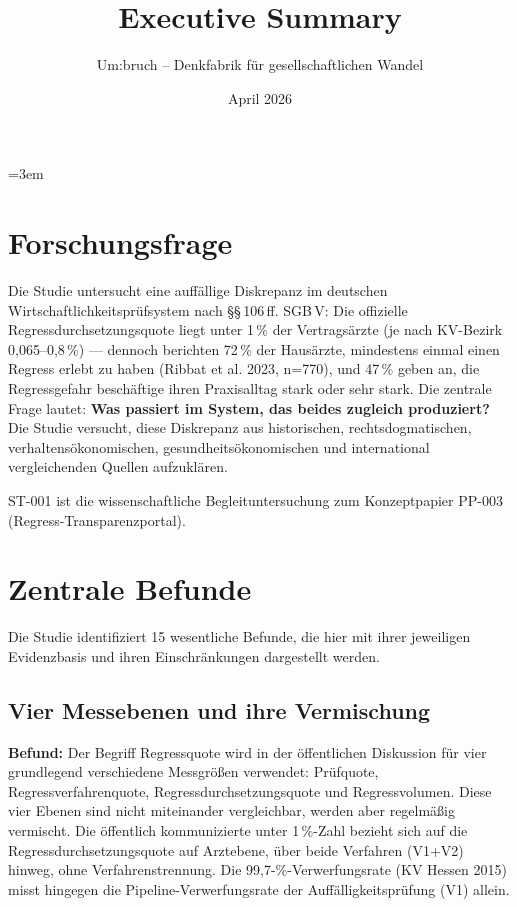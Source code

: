 \documentclass{umbruch-position}
\title{Executive Summary}
\author{Um:bruch -- Denkfabrik f\"ur gesellschaftlichen Wandel}
\date{April 2026}
\begin{document}
\emergencystretch=3em
\maketitle

\section{Forschungsfrage}

Die Studie untersucht eine auff\"allige Diskrepanz im deutschen Wirtschaftlichkeitspr\"ufsystem nach \S\S\,106\,ff. SGB\,V: Die offizielle Regressdurchsetzungsquote liegt unter 1\,\% der Vertrags\"arzte (je nach KV-Bezirk 0,065--0,8\,\%) --- dennoch berichten 72\,\% der Haus\"arzte, mindestens einmal einen Regress erlebt zu haben (Ribbat et al. 2023, n=770), und 47\,\% geben an, die Regressgefahr besch\"aftige ihren Praxisalltag \glqq{}stark oder sehr stark\grqq{}. Die zentrale Frage lautet: \textbf{Was passiert im System, das beides zugleich produziert?} Die Studie versucht, diese Diskrepanz aus historischen, rechtsdogmatischen, verhaltens\"okonomischen, gesundheits\"okonomischen und international vergleichenden Quellen aufzukl\"aren.

ST-001 ist die wissenschaftliche Begleituntersuchung zum Konzeptpapier PP-003 (Regress-Transparenzportal).

\section{Zentrale Befunde}

Die Studie identifiziert 15 wesentliche Befunde, die hier mit ihrer jeweiligen Evidenzbasis und ihren Einschr\"ankungen dargestellt werden.

\subsection{Vier Messebenen und ihre Vermischung}

\textbf{Befund:} Der Begriff \glqq{}Regressquote\grqq{} wird in der \"offentlichen Diskussion f\"ur vier grundlegend verschiedene Messgr\"o\ss{}en verwendet: Pr\"ufquote, Regressverfahrenquote, Regressdurchsetzungsquote und Regressvolumen. Diese vier Ebenen sind nicht miteinander vergleichbar, werden aber regelm\"a\ss{}ig vermischt. Die \"offentlich kommunizierte \glqq{}unter 1\,\%\grqq{}-Zahl bezieht sich auf die Regressdurchsetzungsquote auf Arztebene, \"uber beide Verfahren (V1+V2) hinweg, ohne Verfahrenstrennung. Die 99,7-\%-Verwerfungsrate (KV Hessen 2015) misst hingegen die Pipeline-Verwerfungsrate der Auff\"alligkeitspr\"ufung (V1) allein.
\end{document}
